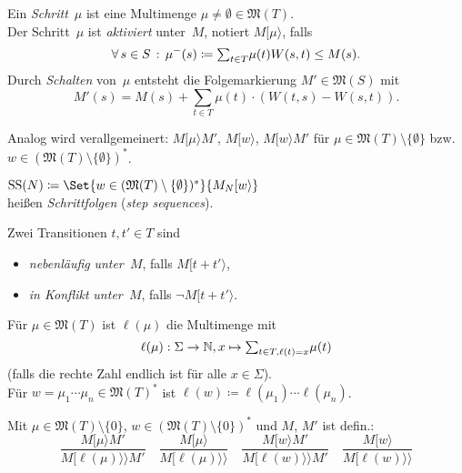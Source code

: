 \documentclass{cheat-sheet}
\newcommand{\activeTransition}[1]{[{#1}\rangle} %
\newcommand{\labelledTransition}[1]{[{#1}\rangle\rangle} %
\newcommand{\inferrule}[2]{\frac{{#1}}{{#2}}} %
\newcommand{\Markings}{\mathfrak{M}} %
\newcommand{\Multisets}{\mathfrak{M}} %
\DeclareMathOperator{\StepSequences}{SS} %
\begin{document}
\begin{defn}
  Ein \emph{Schritt}~$\mu$ ist eine Multimenge $\mu \neq \emptyset \in \Multisets(T)$. \\
  Der Schritt~$\mu$ ist \emph{aktiviert} unter~$M$, notiert $M \activeTransition{\mu}$, falls
  \[
    \fa{s \in S} \mu^{-}(s) \coloneqq {\sum}_{t \in T} \mu(t) W(s, t) \leq M(s).
  \]
  Durch \textit{Schalten} von~$\mu$ entsteht die Folgemarkierung $M' \in \Markings(S)$ mit
  \[
    M'(s) = M(s) + {\sum}_{t \in T} \mu(t) \cdot (W(t, s) - W(s, t)).
  \]
\end{defn}

\begin{bem}
  Analog wird verallgemeinert:
  $M \activeTransition{\mu} M'$, $M \activeTransition{w}$, $M \activeTransition{w} M'$
  für $\mu \in \Markings(T) \setminus \{ \emptyset \}$ bzw. $w \in (\Markings(T) \setminus \{ \emptyset \})^{*}$.
\end{bem}

\begin{defn}
  \begin{minipage}[t]{0.8 \linewidth}
    $\StepSequences(N) \coloneqq \Set{w \in (\Markings(T) \setminus \{ \emptyset \})^{*}}{M_N \activeTransition{w}}$ \\
    heißen \emph{Schrittfolgen} (\textit{step sequences}).
  \end{minipage}
\end{defn}

\begin{defn}
  Zwei Transitionen $t, t' \in T$ sind
  \begin{itemize}
    \item \emph{nebenläufig} \textit{unter~$M$}, falls $M \activeTransition{t + t'}$,
    \item \emph{in Konflikt} \textit{unter~$M$}, falls $\neg M \activeTransition{t + t'}$.
  \end{itemize}
\end{defn}

\begin{nota}
  Für $\mu \in \Multisets(T)$ ist $\ell(\mu)$ die Multimenge mit
  \[
    \ell(\mu) : \Sigma \to \N, x \mapsto {\sum}_{t \in T, \ell(t) = x} \mu(t)
  \]
  (falls die rechte Zahl endlich ist für alle $x \in \Sigma$). \\
  Für $w = \mu_1 \cdots \mu_n \in \Multisets(T)^{*}$ ist 
  $\ell(w) \coloneqq \ell(\mu_1) \cdots \ell(\mu_n)$.
\end{nota}

\begin{defn}
  Mit $\mu \in \Markings(T) \setminus \{ 0 \}$, $w \in (\Markings(T) \setminus \{ 0 \})^{*}$ und $M$, $M'$ ist defin.:
  \[
    \inferrule
      {M \activeTransition{\mu} M'}
      {M \labelledTransition{\ell(\mu)} M'} \quad
    \inferrule
      {M \activeTransition{\mu}}
      {M \labelledTransition{\ell(\mu)}} \quad
    \inferrule
      {M \activeTransition{w} M'}
      {M \labelledTransition{\ell(w)} M'} \quad
    \inferrule
      {M \activeTransition{w}}
      {M \labelledTransition{\ell(w)}}
  \]
\end{defn}
\end{document}

